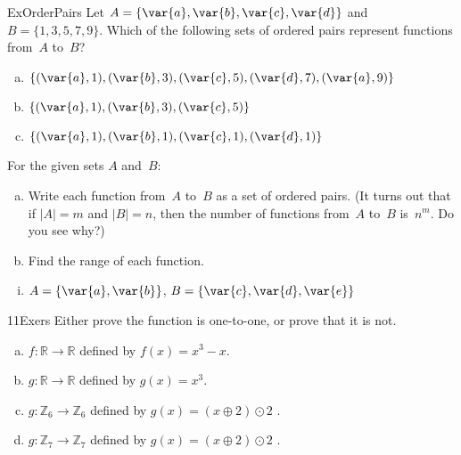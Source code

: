 \begin{exercise}{ExOrderPairs}
Let  $A = \{ \var{a}, \var{b}, \var{c}, \var{d} \}$ and  $B = \{1,3,5,7,9\}$.
Which of the following sets of ordered pairs represent functions from~$A$ to~$B$?

\begin{multicols}{2}
\begin{enumerate}[a.]
\item \label{WhichAreFuncsEx-a1b3c5d7e9a11}
$\{ (\var{a}, 1), (\var{b}, 3), (\var{c}, 5), (\var{d}, 7), (\var{a},9) \}$
\item \label{WhichAreFuncsEx-a1b3c5e7}
$\{ (\var{a}, 1), (\var{b}, 3), (\var{c}, 5) \}$
\item \label{WhichAreFuncsEx-a1b1c1d1e1}
$\{ (\var{a}, 1), (\var{b}, 1), (\var{c}, 1), (\var{d}, 1) \}$
\end{enumerate}
\end{multicols}
\end{exercise}

\begin{exercise}{27}
 For the given sets $A$ and~$B$:
\begin{enumerate}[(a)] 
\item Write each function from~$A$ to~$B$ as a set of ordered pairs. (It turns out that if $|A| = m$
and $|B| = n$, then the number of functions from~$A$ to~$B$ is~$n^m$. Do you see why?)
\item Find the range of each function.
\end{enumerate}
\begin{enumerate}[i.]
\item \label{FunctionsChapExers-FindAll-ab,cde}
$A = \{\var{a},\var{b}\}$, $B = \{\var{c},\var{d},\var{e}\}$
\end{enumerate}
\end{exercise}

\begin{exercise}{11Exers}
Either prove the function is one-to-one, or prove that it is not.
\begin{multicols}{2}
 \begin{enumerate}[(a)]
\item \label{11Exers-formula-f}
 $f \colon {\mathbb R} \to {\mathbb R}$ defined by $f(x) = x^3 - x$.
\item \label{11Exers-formula-g}
 $g \colon {\mathbb R} \to {\mathbb R}$ defined by $g(x) = x^3$.
\item \label{modular_g}
 $g \colon {\mathbb Z}_6 \to {\mathbb Z}_6$ defined by $g(x)= (x \oplus 2) \odot 2$ .
\item \label{modular_g}
 $g \colon {\mathbb Z}_7 \to {\mathbb Z}_7$ defined by $g(x)= (x \oplus 2) \odot 2$ .
\end{enumerate}
\end{multicols}
\end{exercise}

